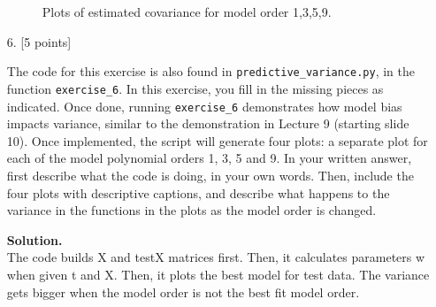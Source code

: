 \documentclass[10pt]{article}
\begin{document}
\begin{itemize}
\begin{figure}[h!]
\begin{center}

\caption{Plots of estimated covariance for model order 1,3,5,9.\label{fig:fn-samples}}
\end{center}
\end{figure}

\newpage
\FloatBarrier
\item[6.] [5 points]

The code for this exercise is also found in {\tt predictive\_variance.py}, in the function {\tt exercise\_6}.
In this exercise, you fill in the missing pieces as indicated. Once done, running {\tt exercise\_6} demonstrates how model bias impacts variance, similar to the demonstration in Lecture 9 (starting slide 10).  Once implemented, the script will generate four plots: a separate plot for each of the model polynomial orders 1, 3, 5 and 9. In your written answer, first describe what the code is doing, in your own words. Then, include the four plots with descriptive captions, and describe what happens to the variance in the functions in the plots as the model order is changed.

{\bf Solution.}\\
The code builds X and testX matrices first. Then, it calculates parameters w when given t and X. Then, it plots the best model for test data. The variance gets bigger when the model order is not the best fit model order.


\end{itemize}
\end{document}
